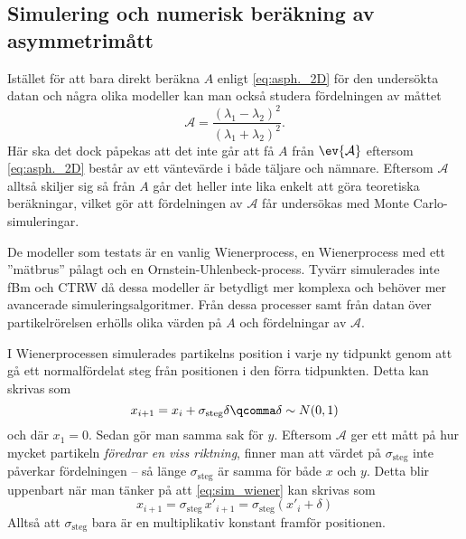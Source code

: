 \subsection{Simulering och numerisk beräkning av asymmetrimått} 
\label{sec:sim_asym}
Istället för att bara direkt beräkna $A$ enligt \eqref{eq:asph._2D} för den undersökta datan och några olika modeller kan man också studera fördelningen av måttet 
\begin{equation}\label{eq:asym}
\mathcal{A} =
\frac{(\lambda_1 - \lambda_2)^2}{(\lambda_1 + \lambda_2)^2}.
\end{equation}
Här ska det dock påpekas att det inte går att få $A$ från  $\ev{\mathcal{A}}$ eftersom \eqref{eq:asph._2D} består av ett väntevärde i både täljare och nämnare. Eftersom $\mathcal{A}$ alltså skiljer sig så från $A$ går det heller inte lika enkelt att göra teoretiska beräkningar, vilket gör att fördelningen av $\mathcal{A}$ får undersökas med Monte Carlo-simuleringar.



De modeller som testats är en vanlig Wienerprocess, en Wienerprocess med ett ''mätbrus'' pålagt och en Ornstein-Uhlenbeck-process. Tyvärr simulerades inte fBm och CTRW då dessa modeller är betydligt mer komplexa och behöver mer avancerade simuleringsalgoritmer. 
Från dessa processer samt från datan över partikelrörelsen erhölls olika värden på $A$ och fördelningar av $\mathcal{A}$. 


I Wienerprocessen simulerades partikelns position i varje ny tidpunkt genom att gå ett normalfördelat steg från positionen i den förra tidpunkten. Detta kan skrivas som
\begin{equation}\label{eq:sim_wiener}
x_{i+1} = x_i + \sigma_\text{steg}\delta 
\qcomma  \delta \sim N(0, 1)
\end{equation}
och där $x_1=0$. Sedan gör man samma sak för $y$. Eftersom $\mathcal{A}$ ger ett mått på hur mycket partikeln \emph{föredrar en viss riktning}, finner man att värdet på $\sigma_\text{steg}$ inte påverkar fördelningen -- så länge $\sigma_\text{steg}$ är samma för både $x$ och $y$. Detta blir uppenbart när man tänker på att \eqref{eq:sim_wiener} kan skrivas som 
\begin{equation}
x_{i+1} =\sigma_\text{steg}\,x'_{i+1} = \sigma_\text{steg}\left( x'_i + \delta \right) 
\end{equation}
Alltså att $\sigma_\text{steg}$ bara är en multiplikativ konstant framför positionen.


